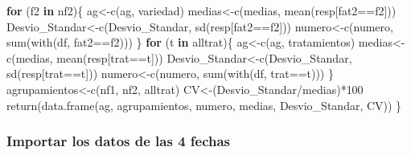 \documentclass[
]{article}
\newenvironment{Shaded}{\begin{snugshade}}{\end{snugshade}}
\newcommand{\ControlFlowTok}[1]{\textcolor[rgb]{0.13,0.29,0.53}{\textbf{#1}}}
\newcommand{\DecValTok}[1]{\textcolor[rgb]{0.00,0.00,0.81}{#1}}
\newcommand{\FunctionTok}[1]{\textcolor[rgb]{0.00,0.00,0.00}{#1}}
\newcommand{\NormalTok}[1]{#1}
\newcommand{\OtherTok}[1]{\textcolor[rgb]{0.56,0.35,0.01}{#1}}
\newcommand{\SpecialCharTok}[1]{\textcolor[rgb]{0.00,0.00,0.00}{#1}}
\newcommand{\StringTok}[1]{\textcolor[rgb]{0.31,0.60,0.02}{#1}}
\begin{document}
\begin{Shaded}
\begin{Highlighting}[]
  \ControlFlowTok{for}\NormalTok{ (f2 }\ControlFlowTok{in}\NormalTok{ nf2)\{}
\NormalTok{    ag}\OtherTok{\textless{}{-}}\FunctionTok{c}\NormalTok{(ag, }\StringTok{\textquotesingle{}variedad\textquotesingle{}}\NormalTok{)}
\NormalTok{    medias}\OtherTok{\textless{}{-}}\FunctionTok{c}\NormalTok{(medias, }\FunctionTok{mean}\NormalTok{(resp[fat2}\SpecialCharTok{==}\NormalTok{f2]))}
\NormalTok{    Desvio\_Standar}\OtherTok{\textless{}{-}}\FunctionTok{c}\NormalTok{(Desvio\_Standar, }\FunctionTok{sd}\NormalTok{(resp[fat2}\SpecialCharTok{==}\NormalTok{f2]))}
\NormalTok{    numero}\OtherTok{\textless{}{-}}\FunctionTok{c}\NormalTok{(numero, }\FunctionTok{sum}\NormalTok{(}\FunctionTok{with}\NormalTok{(df, fat2}\SpecialCharTok{==}\NormalTok{f2)))}
\NormalTok{  \}}
  \ControlFlowTok{for}\NormalTok{ (t }\ControlFlowTok{in}\NormalTok{ alltrat)\{}
\NormalTok{    ag}\OtherTok{\textless{}{-}}\FunctionTok{c}\NormalTok{(ag, }\StringTok{\textquotesingle{}tratamientos\textquotesingle{}}\NormalTok{)}
\NormalTok{    medias}\OtherTok{\textless{}{-}}\FunctionTok{c}\NormalTok{(medias, }\FunctionTok{mean}\NormalTok{(resp[trat}\SpecialCharTok{==}\NormalTok{t]))}
\NormalTok{    Desvio\_Standar}\OtherTok{\textless{}{-}}\FunctionTok{c}\NormalTok{(Desvio\_Standar, }\FunctionTok{sd}\NormalTok{(resp[trat}\SpecialCharTok{==}\NormalTok{t]))}
\NormalTok{    numero}\OtherTok{\textless{}{-}}\FunctionTok{c}\NormalTok{(numero, }\FunctionTok{sum}\NormalTok{(}\FunctionTok{with}\NormalTok{(df, trat}\SpecialCharTok{==}\NormalTok{t)))}
\NormalTok{  \}}
\NormalTok{  agrupamientos}\OtherTok{\textless{}{-}}\FunctionTok{c}\NormalTok{(nf1, nf2, alltrat)}
\NormalTok{  CV}\OtherTok{\textless{}{-}}\NormalTok{(Desvio\_Standar}\SpecialCharTok{/}\NormalTok{medias)}\SpecialCharTok{*}\DecValTok{100}
  \FunctionTok{return}\NormalTok{(}\FunctionTok{data.frame}\NormalTok{(ag, agrupamientos, numero, medias, Desvio\_Standar, CV))}
\NormalTok{\}}
\end{Highlighting}
\end{Shaded}

\hypertarget{importar-los-datos-de-las-4-fechas}{%
\subsubsection{Importar los datos de las 4
fechas}\label{importar-los-datos-de-las-4-fechas}}
\end{document}
